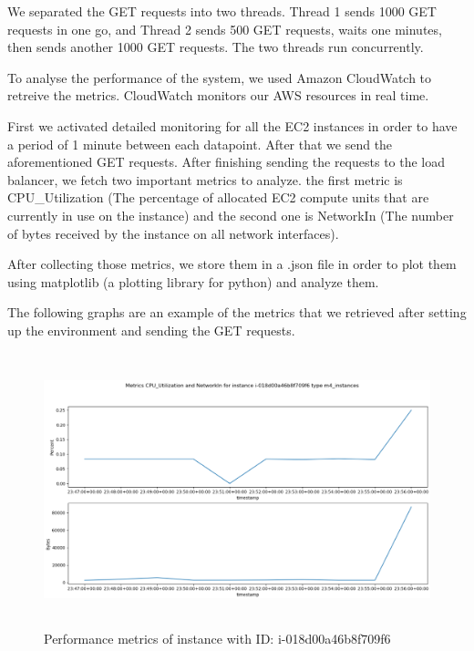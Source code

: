 \documentclass[12pt]{article}
\begin{document}
We separated the GET requests into two threads. Thread 1 sends 1000 GET requests in one go, and Thread 2 sends 500 GET requests, waits one minutes, then sends another 1000 GET requests. The two threads run concurrently.\vspace{1em}

To analyse the performance of the system, we used Amazon CloudWatch to retreive the metrics. CloudWatch monitors our AWS resources in real time.\vspace{1em}

First we activated detailed monitoring for all the EC2 instances in order to have a period of 1 minute between each datapoint. After that we send the aforementioned GET requests. After finishing sending the requests to the load balancer, we fetch two important metrics to analyze. the first metric is CPU\_Utilization (The percentage of allocated EC2 compute units that are currently in use on the instance) and the second one is NetworkIn (The number of bytes received by the instance on all network interfaces).\vspace{1em}

After collecting those metrics, we store them in a .json file in order to plot them using matplotlib (a plotting library for python) and analyze them.\vspace{1em}

The following graphs are an example of the metrics that we retrieved after setting up the environment and sending the GET requests.\vspace{7em}

\begin{figure}[htbp]
\centering
  \includegraphics[height=300px]{Capture1.png}
  \caption{Performance metrics of instance with ID: i-018d00a46b8f709f6}
\end{figure}
\end{document}
